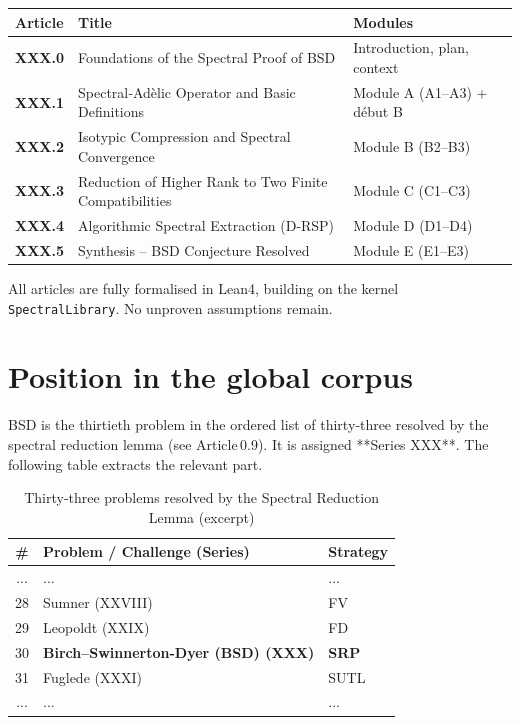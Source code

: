 \documentclass[11pt,a4paper]{article}
\begin{document}
\begin{center}
\small
\begin{tabular}{@{}>{\bfseries}l>{\raggedright\arraybackslash}p{4.5cm}>{\raggedright\arraybackslash}p{6cm}@{}}
\toprule
\textbf{Article} & \textbf{Title} & \textbf{Modules} \\
\midrule
XXX.0 & Foundations of the Spectral Proof of BSD & Introduction, plan, context \\
XXX.1 & Spectral‑Adèlic Operator and Basic Definitions & Module A (A1–A3) + début B \\
XXX.2 & Isotypic Compression and Spectral Convergence & Module B (B2–B3) \\
XXX.3 & Reduction of Higher Rank to Two Finite Compatibilities & Module C (C1–C3) \\
XXX.4 & Algorithmic Spectral Extraction (D‑RSP) & Module D (D1–D4) \\
XXX.5 & Synthesis – BSD Conjecture Resolved & Module E (E1–E3) \\
\bottomrule
\end{tabular}
\end{center}

All articles are fully formalised in Lean4, building on the kernel \texttt{SpectralLibrary}. No unproven assumptions remain.

\section{Position in the global corpus}

BSD is the thirtieth problem in the ordered list of thirty‑three resolved by the spectral reduction lemma (see Article 0.9). It is assigned **Series XXX**. The following table extracts the relevant part.

\begin{center}
\begin{longtable}{@{}cll@{}}
\caption{Thirty‑three problems resolved by the Spectral Reduction Lemma (excerpt)}\\
\toprule
\# & Problem / Challenge (Series) & Strategy \\
\midrule
... & ... & ... \\
28 & Sumner (XXVIII) & FV \\
29 & Leopoldt (XXIX) & FD \\
30 & \textbf{Birch–Swinnerton-Dyer (BSD) (XXX)} & \textbf{SRP} \\
31 & Fuglede (XXXI) & SUTL \\
... & ... & ... \\
\bottomrule
\end{longtable}
\end{center}
\end{document}
